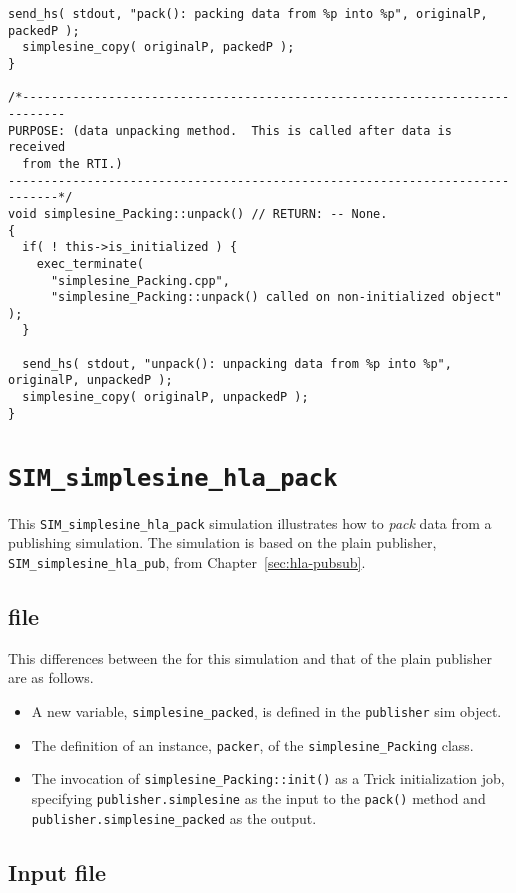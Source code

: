 \begin{lstlisting}[caption={{\tt simplesine\_Packing} class methods}]
  send_hs( stdout, "pack(): packing data from %p into %p", originalP, packedP );
  simplesine_copy( originalP, packedP );
}

/*----------------------------------------------------------------------------
PURPOSE: (data unpacking method.  This is called after data is received
  from the RTI.)
-----------------------------------------------------------------------------*/
void simplesine_Packing::unpack() // RETURN: -- None.
{
  if( ! this->is_initialized ) {
    exec_terminate(
      "simplesine_Packing.cpp",
      "simplesine_Packing::unpack() called on non-initialized object" );
  }

  send_hs( stdout, "unpack(): unpacking data from %p into %p", originalP, unpackedP );
  simplesine_copy( originalP, unpackedP );
}
\end{lstlisting}

\section{\tt SIM\_simplesine\_hla\_pack}

This {\tt SIM\_simplesine\_hla\_pack} simulation illustrates how to
{\em pack} data from a publishing simulation.
The simulation is based on the plain publisher,
{\tt SIM\_simplesine\_hla\_pub}, from
Chapter~\ref{sec:hla-pubsub}.

\subsection{\sdefine file}
This differences between the \sdefine for this simulation and that
of the plain publisher are as follows.

\begin{itemize}
\item{
  A new \simplesine variable, {\tt simplesine\_packed},
  is defined in the {\tt publisher} sim object.
}
\item{
  The definition of an instance, {\tt packer},
  of the {\tt simplesine\_Packing} class.
}
\item{
  The invocation of {\tt simplesine\_Packing::init()} as a Trick
  initialization job,
  specifying {\tt publisher.simplesine} as the input to the {\tt pack()}
  method and {\tt publisher.simple\-sine\_\-packed} as the output.
}
\end{itemize}

\subsection{Input file}

